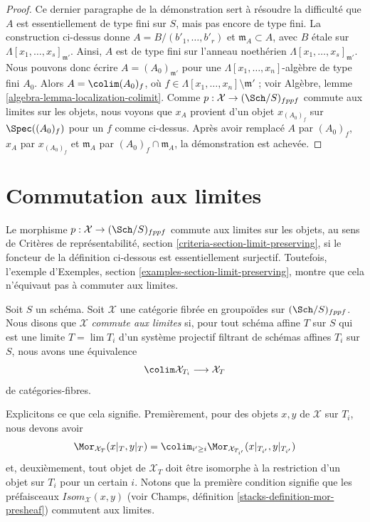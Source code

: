 \begin{proof}
\medskip\noindent
Ce dernier paragraphe de la démonstration sert à résoudre la difficulté que
$A$ est essentiellement de type fini sur $S$, mais pas encore de type fini.
La construction ci-dessus donne $A = B/(b'_1, \ldots, b'_r)$ et
$\mathfrak m_A \subset A$, avec $B$ étale sur
$\Lambda[x_1, \ldots, x_s]_{\mathfrak m'}$. Ainsi, $A$ est de type fini sur
l'anneau noethérien $\Lambda[x_1, \ldots, x_s]_{\mathfrak m'}$. Nous pouvons
donc écrire $A = (A_0)_{\mathfrak m'}$ pour une
$\Lambda[x_1, \ldots, x_n]$-algèbre de type fini $A_0$. Alors
$A = \colim (A_0)_f$, où
$f \in \Lambda[x_1, \ldots, x_n] \setminus \mathfrak m'$ ; voir Algèbre,
lemme \ref{algebra-lemma-localization-colimit}. Comme
$p : \mathcal{X} \to (\Sch/S)_{fppf}$ commute aux limites sur les objets,
nous voyons que $x_A$ provient d'un objet $x_{(A_0)_f}$ sur
$\Spec((A_0)_f)$ pour un $f$ comme ci-dessus. Après avoir remplacé $A$ par
$(A_0)_f$, $x_A$ par $x_{(A_0)_f}$ et $\mathfrak m_A$ par
$(A_0)_f \cap \mathfrak m_A$, la démonstration est achevée.
\end{proof}





\section{Commutation aux limites}
\label{section-limits}

\noindent
Le morphisme $p : \mathcal{X} \to (\Sch/S)_{fppf}$ commute aux limites sur les
objets, au sens de Critères de représentabilité, section
\ref{criteria-section-limit-preserving}, si le foncteur de la définition
ci-dessous est essentiellement surjectif. Toutefois, l'exemple d'Exemples,
section \ref{examples-section-limit-preserving}, montre que cela n'équivaut
pas à commuter aux limites.

\begin{definition}
\label{definition-limit-preserving}
Soit $S$ un schéma. Soit $\mathcal{X}$ une catégorie fibrée en groupoïdes sur
$(\Sch/S)_{fppf}$. Nous disons que $\mathcal{X}$ {\it commute aux limites} si,
pour tout schéma affine $T$ sur $S$ qui est une limite $T = \lim T_i$ d'un
système projectif filtrant de schémas affines $T_i$ sur $S$, nous avons une
équivalence
$$
\colim \mathcal{X}_{T_i} \longrightarrow \mathcal{X}_T
$$
de catégories-fibres.
\end{definition}

\noindent
Explicitons ce que cela signifie. Premièrement, pour des objets $x, y$ de
$\mathcal{X}$ sur $T_i$, nous devons avoir
$$
\Mor_{\mathcal{X}_T}(x|_T, y|_T) =
\colim_{i' \geq i} \Mor_{\mathcal{X}_{T_{i'}}}(x|_{T_{i'}}, y|_{T_{i'}})
$$
et, deuxièmement, tout objet de $\mathcal{X}_T$ doit être isomorphe à la
restriction d'un objet sur $T_i$ pour un certain $i$. Notons que la première
condition signifie que les préfaisceaux $\mathit{Isom}_\mathcal{X}(x, y)$
(voir Champs, définition \ref{stacks-definition-mor-presheaf}) commutent aux
limites.

